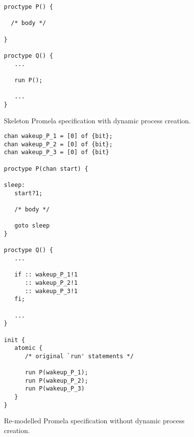 %
\begin{figure}
\begin{scriptsize}
\begin{verbatim}
proctype P() {

  /* body */

}

proctype Q() {
   ...

   run P();

   ...
}
\end{verbatim}
\end{scriptsize}
\caption{Skeleton Promela specification with dynamic process
creation.}\label{fig:limitations:originaldynamic}
\end{figure}
%
\begin{figure}[t]
\begin{scriptsize}
\begin{verbatim}
chan wakeup_P_1 = [0] of {bit};
chan wakeup_P_2 = [0] of {bit};
chan wakeup_P_3 = [0] of {bit}

proctype P(chan start) {

sleep:
   start?1;

   /* body */

   goto sleep
}

proctype Q() {
   ...

   if :: wakeup_P_1!1
      :: wakeup_P_2!1
      :: wakeup_P_3!1
   fi;

   ...
}

init {
   atomic {
      /* original `run' statements */

      run P(wakeup_P_1);
      run P(wakeup_P_2);
      run P(wakeup_P_3)
   }
}
\end{verbatim}
\end{scriptsize}
\caption{Re-modelled Promela specification without dynamic process
creation.}\label{fig:limitations:remodelleddynamic}
\end{figure}


